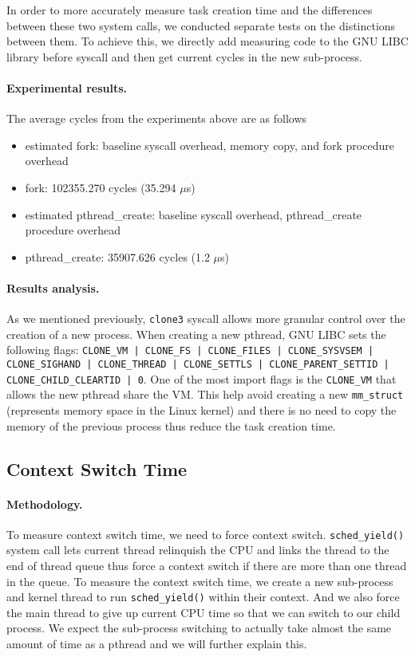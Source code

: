 In order to more accurately measure task creation time and the differences between these two system calls, we conducted separate tests on the distinctions between them. To achieve this, we directly add measuring code to the GNU LIBC library before syscall and then get current cycles in the new sub-process. 

\paragraph{Experimental results.}
The average cycles from the experiments above are as follows
\begin{itemize}[leftmargin=*]
    \item estimated fork: baseline syscall overhead, memory copy, and fork procedure overhead
	\item fork: 102355.270 cycles (35.294 $\mu$s)
    \item estimated pthread\_create: baseline syscall overhead, pthread\_create procedure overhead
	\item pthread\_create: 35907.626 cycles (1.2 $\mu$s)
\end{itemize}

\paragraph{Results analysis.} As we mentioned previously, \texttt{clone3} syscall allows more granular control over the creation of a new process. When creating a new pthread, GNU LIBC sets the following flags: \texttt{CLONE\_VM | CLONE\_FS | CLONE\_FILES | CLONE\_SYSVSEM | CLONE\_SIGHAND | CLONE\_THREAD | CLONE\_SETTLS | CLONE\_PARENT\_SETTID | CLONE\_CHILD\_CLEARTID | 0}. One of the most import flags is the \texttt{CLONE\_VM} that allows the new pthread share the VM. This help avoid creating a new \texttt{mm\_struct} (represents memory space in the Linux kernel) and there is no need to copy the memory of the previous process thus reduce the task creation time.

\subsection{Context Switch Time}
\paragraph{Methodology.} To measure context switch time, we need to force context switch. \texttt{sched\_yield()} system call lets current thread relinquish the CPU and links the thread to the end of thread queue thus force a context switch if there are more than one thread in the queue. To measure the context switch time, we create a new sub-process and kernel thread to run \texttt{sched\_yield()} within their context. And we also force the main thread to give up current CPU time so that we can switch to our child process. We expect the sub-process switching to actually take almost the same amount of time as a pthread and we will further explain this.

